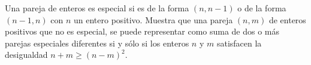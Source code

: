 Una pareja de enteros es especial si es de la forma $(n, n − 1)$ o de la forma $(n − 1, n)$ con $n$ un entero positivo. Muestra que una pareja $(n, m)$ de enteros positivos que no es especial, se puede representar como suma de dos o más parejas especiales diferentes si y sólo si los enteros $n$ y $m$ satisfacen la desigualdad $n + m \geq (n − m)^2$.